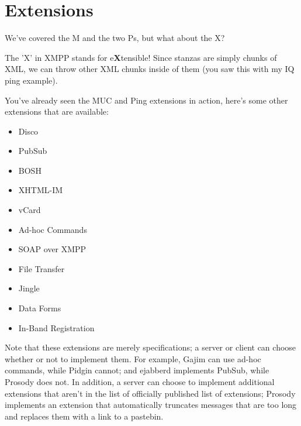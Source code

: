 \section{Extensions}

\pause

We've covered the M and the two Ps, but what about the X?

\pause

The 'X' in XMPP stands for e\textbf{X}tensible!  Since stanzas are simply chunks of XML,
we can throw other XML chunks inside of them (you saw this with my IQ ping example).

\pause
You've already seen the MUC and Ping extensions in action, here's some other extensions that
are available:

\pause
\begin{itemize}
\setlength{\itemsep}{1pt}

\item Disco
\pause
\item PubSub
\pause
\item BOSH
\pause
\item XHTML-IM
\pause
\item vCard
\pause
\item Ad-hoc Commands
\pause
\item SOAP over XMPP
\pause
\item File Transfer
\pause
\item Jingle
\pause
\item Data Forms
\pause
\item In-Band Registration
\end{itemize}

\pause

Note that these extensions are merely specifications; a server or client can choose whether or not to implement
them.  For example, Gajim can use ad-hoc commands, while Pidgin cannot; and ejabberd implements PubSub, while
Prosody does not.  In addition, a server can choose to implement additional extensions that aren't in the list
of officially published list of extensions; Prosody implements an extension that automatically truncates messages
that are too long and replaces them with a link to a pastebin.
